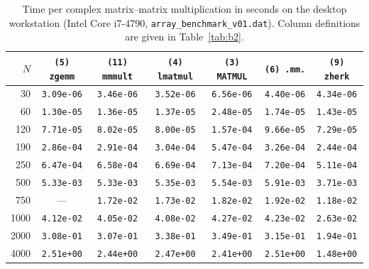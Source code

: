 \begin{table}[htbp]
\centering
\begin{tabular}{r c c c c c c}
\toprule
$N$ & \texttt{(5) zgemm} & \texttt{(11) mmmult} & \texttt{(4) lmatmul} & \texttt{(3) MATMUL} & \texttt{(6) .mm.} & \texttt{(9) zherk} \\
\midrule
30   & \texttt{3.09e-06} & \texttt{3.46e-06} & \texttt{3.52e-06} & \texttt{6.56e-06} & \texttt{4.40e-06} & \texttt{4.34e-06} \\
60   & \texttt{1.30e-05} & \texttt{1.36e-05} & \texttt{1.37e-05} & \texttt{2.48e-05} & \texttt{1.74e-05} & \texttt{1.43e-05} \\
120  & \texttt{7.71e-05} & \texttt{8.02e-05} & \texttt{8.00e-05} & \texttt{1.57e-04} & \texttt{9.66e-05} & \texttt{7.29e-05} \\
190  & \texttt{2.86e-04} & \texttt{2.91e-04} & \texttt{3.04e-04} & \texttt{5.47e-04} & \texttt{3.26e-04} & \texttt{2.44e-04} \\
250  & \texttt{6.47e-04} & \texttt{6.58e-04} & \texttt{6.69e-04} & \texttt{7.13e-04} & \texttt{7.20e-04} & \texttt{5.11e-04} \\
500  & \texttt{5.33e-03} & \texttt{5.33e-03} & \texttt{5.35e-03} & \texttt{5.54e-03} & \texttt{5.91e-03} & \texttt{3.71e-03} \\
750  & ---               & \texttt{1.72e-02} & \texttt{1.73e-02} & \texttt{1.82e-02} & \texttt{1.92e-02} & \texttt{1.18e-02} \\
1000 & \texttt{4.12e-02} & \texttt{4.05e-02} & \texttt{4.08e-02} & \texttt{4.27e-02} & \texttt{4.23e-02} & \texttt{2.63e-02} \\
2000 & \texttt{3.08e-01} & \texttt{3.07e-01} & \texttt{3.38e-01} & \texttt{3.49e-01} & \texttt{3.15e-01} & \texttt{1.94e-01} \\
4000 & \texttt{2.51e+00} & \texttt{2.44e+00} & \texttt{2.47e+00} & \texttt{2.41e+00} & \texttt{2.51e+00} & \texttt{1.48e+00} \\
\bottomrule
\end{tabular}
\caption{\label{tab:b1}Time per complex matrix--matrix multiplication in seconds on the desktop workstation (Intel Core i7-4790, \texttt{array\_benchmark\_v01.dat}). Column definitions are given in Table~\ref{tab:b2}.}
\end{table}

